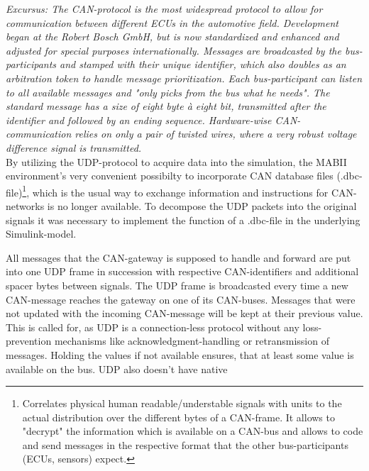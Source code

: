 \documentclass[ExampleMasters.tex]{subfiles}
\begin{document}
\textit{Excursus: The CAN-protocol is the most widespread protocol to allow for communication between different ECUs in the automotive field. Development began at the Robert Bosch GmbH, but is now standardized and enhanced and adjusted for special purposes internationally. Messages are broadcasted by the bus-participants and stamped with their unique identifier, which also doubles as an arbitration token to handle message prioritization. Each bus-participant can listen to all available messages and "only picks from the bus what he needs". The standard message has a size of eight byte \`{a} eight bit, transmitted after the identifier and followed by an ending sequence. Hardware-wise CAN-communication relies on only a pair of twisted wires, where a very robust voltage difference signal is transmitted. }\cite{CAN_intro}\\


By utilizing the UDP-protocol to acquire data into the simulation, the MABII environment's very convenient possibilty to incorporate CAN database files (.dbc-file)\footnote{Correlates physical human readable/understable signals with units to the actual distribution over the different bytes of a CAN-frame. It allows to "decrypt" the information which is available on a CAN-bus and allows to code and send messages in the respective format that the other bus-participants (ECUs, sensors) expect.}, which is the usual way to exchange information and instructions for CAN-networks is no longer available. To decompose the UDP packets into the original signals it was necessary to implement the function of a .dbc-file in the underlying Simulink-model. 

All messages that the CAN-gateway is supposed to handle and forward are put into one UDP frame in succession with respective CAN-identifiers and additional spacer bytes between signals. The UDP frame is broadcasted every time a new CAN-message reaches the gateway on one of its CAN-buses. Messages that were not updated with the incoming CAN-message will be kept at their previous value. This is called for, as UDP is a connection-less protocol without any loss-prevention mechanisms like acknowledgment-handling or retransmission of messages. Holding the values if not available ensures, that at least some value is available on the bus. UDP also doesn't have native 
\end{document}

